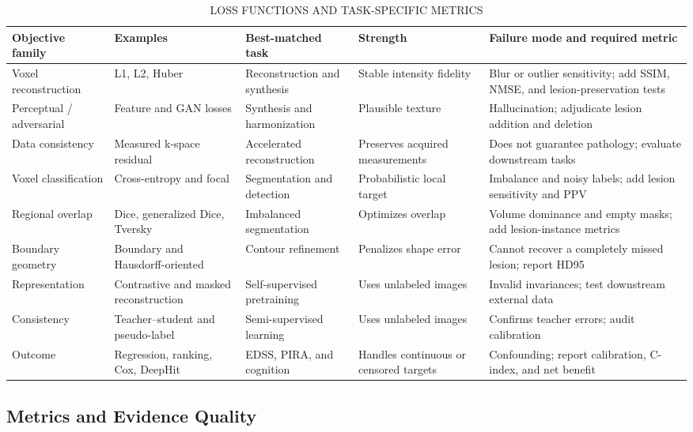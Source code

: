 \documentclass[journal,twoside,web]{ieeecolor}
\begin{document}
\begin{table}[!t]
\centering
\caption{LOSS FUNCTIONS AND TASK-SPECIFIC METRICS}
\label{tab:4}
\scriptsize
\setlength{\tabcolsep}{2.2pt}
\renewcommand{\arraystretch}{1.10}
\begin{tabularx}{\textwidth}{@{}ZZZZZ@{}}
\toprule
\textbf{Objective family} & \textbf{Examples} & \textbf{Best-matched task} & \textbf{Strength} & \textbf{Failure mode and required metric} \\
\midrule
Voxel reconstruction & L1, L2, Huber & Reconstruction and synthesis & Stable intensity fidelity & Blur or outlier sensitivity; add SSIM, NMSE, and lesion-preservation tests \\
Perceptual / adversarial & Feature and GAN losses & Synthesis and harmonization & Plausible texture & Hallucination; adjudicate lesion addition and deletion \\
Data consistency & Measured k-space residual & Accelerated reconstruction & Preserves acquired measurements & Does not guarantee pathology; evaluate downstream tasks \\
Voxel classification & Cross-entropy and focal & Segmentation and detection & Probabilistic local target & Imbalance and noisy labels; add lesion sensitivity and PPV \\
Regional overlap & Dice, generalized Dice, Tversky & Imbalanced segmentation & Optimizes overlap & Volume dominance and empty masks; add lesion-instance metrics \\
Boundary geometry & Boundary and Hausdorff-oriented & Contour refinement & Penalizes shape error & Cannot recover a completely missed lesion; report HD95 \\
Representation & Contrastive and masked reconstruction & Self-supervised pretraining & Uses unlabeled images & Invalid invariances; test downstream external data \\
Consistency & Teacher--student and pseudo-label & Semi-supervised learning & Uses unlabeled images & Confirms teacher errors; audit calibration \\
Outcome & Regression, ranking, Cox, DeepHit & EDSS, PIRA, and cognition & Handles continuous or censored targets & Confounding; report calibration, C-index, and net benefit \\
\bottomrule
\end{tabularx}
\end{table}

\subsection{Metrics and Evidence Quality}\label{subsec:metrics-and-evidence-quality}
\end{document}
